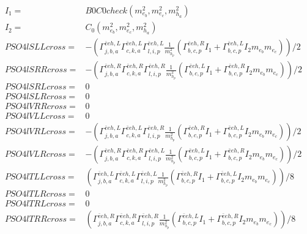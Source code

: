 \documentclass[A4,landscape]{article}
\begin{document}
\begin{align} 
I_1= & B0C0check(m^2_{e_{{b}}}, m^2_{e_{{c}}}, m^2_{h_{{a}}}) \\ 
I_2= & C_0(m^2_{e_{{b}}}, m^2_{e_{{c}}}, m^2_{h_{{a}}}) \\ 
  PSO4lSLLcross= & -( \Gamma^{\bar{e}e h ,L}_{j, b, a} \Gamma^{\bar{e}e h ,L}_{c, k, a} \Gamma^{\bar{e}e h ,L}_{l, i, p} \frac{1}{m^2_{h_{{p}}}} (\Gamma^{\bar{e}e h ,R}_{b, c, p} I_1 + \Gamma^{\bar{e}e h ,L}_{b, c, p} I_2 m_{e_{{b}}} m_{e_{{c}}}))/2 \\ 
  PSO4lSRRcross= & -( \Gamma^{\bar{e}e h ,R}_{j, b, a} \Gamma^{\bar{e}e h ,R}_{c, k, a} \Gamma^{\bar{e}e h ,R}_{l, i, p} \frac{1}{m^2_{h_{{p}}}} (\Gamma^{\bar{e}e h ,L}_{b, c, p} I_1 + \Gamma^{\bar{e}e h ,R}_{b, c, p} I_2 m_{e_{{b}}} m_{e_{{c}}}))/2 \\ 
  PSO4lSRLcross= & 0 \\ 
  PSO4lSLRcross= & 0 \\ 
  PSO4lVRRcross= & 0 \\ 
  PSO4lVLLcross= & 0 \\ 
  PSO4lVRLcross= & -( \Gamma^{\bar{e}e h ,L}_{j, b, a} \Gamma^{\bar{e}e h ,L}_{c, k, a} \Gamma^{\bar{e}e h ,R}_{l, i, p} \frac{1}{m^2_{h_{{p}}}} (\Gamma^{\bar{e}e h ,R}_{b, c, p} I_1 + \Gamma^{\bar{e}e h ,L}_{b, c, p} I_2 m_{e_{{b}}} m_{e_{{c}}}))/2 \\ 
  PSO4lVLRcross= & -( \Gamma^{\bar{e}e h ,R}_{j, b, a} \Gamma^{\bar{e}e h ,R}_{c, k, a} \Gamma^{\bar{e}e h ,L}_{l, i, p} \frac{1}{m^2_{h_{{p}}}} (\Gamma^{\bar{e}e h ,L}_{b, c, p} I_1 + \Gamma^{\bar{e}e h ,R}_{b, c, p} I_2 m_{e_{{b}}} m_{e_{{c}}}))/2 \\ 
  PSO4lTLLcross= & ( \Gamma^{\bar{e}e h ,L}_{j, b, a} \Gamma^{\bar{e}e h ,L}_{c, k, a} \Gamma^{\bar{e}e h ,L}_{l, i, p} \frac{1}{m^2_{h_{{p}}}} (\Gamma^{\bar{e}e h ,R}_{b, c, p} I_1 + \Gamma^{\bar{e}e h ,L}_{b, c, p} I_2 m_{e_{{b}}} m_{e_{{c}}}))/8 \\ 
  PSO4lTLRcross= & 0 \\ 
  PSO4lTRLcross= & 0 \\ 
  PSO4lTRRcross= & ( \Gamma^{\bar{e}e h ,R}_{j, b, a} \Gamma^{\bar{e}e h ,R}_{c, k, a} \Gamma^{\bar{e}e h ,R}_{l, i, p} \frac{1}{m^2_{h_{{p}}}} (\Gamma^{\bar{e}e h ,L}_{b, c, p} I_1 + \Gamma^{\bar{e}e h ,R}_{b, c, p} I_2 m_{e_{{b}}} m_{e_{{c}}}))/8 \\ 
\end{align} 
\end{document}
